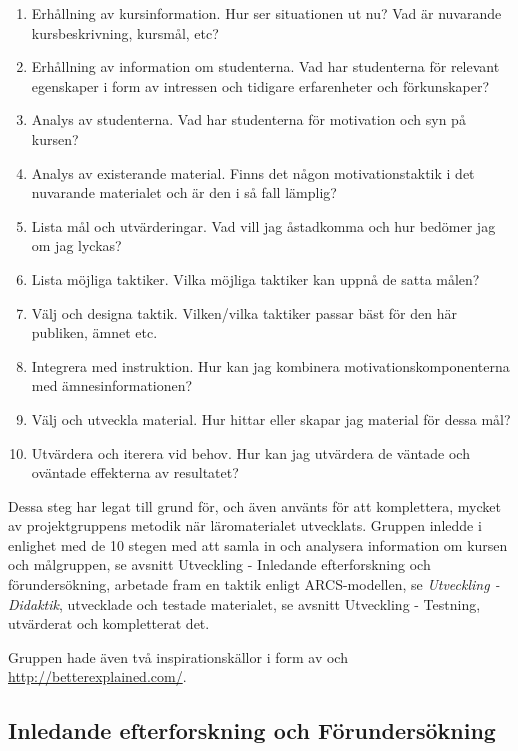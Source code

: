 \documentclass[]{article}
\begin{document}
\begin{enumerate}
  \item Erhållning av kursinformation. Hur ser situationen ut nu? Vad är nuvarande kursbeskrivning, kursmål, etc?
  \item Erhållning av information om studenterna. Vad har studenterna för relevant egenskaper i form av intressen och 
  tidigare erfarenheter och förkunskaper?
  \item Analys av studenterna. Vad har studenterna för motivation och syn på kursen?
  \item Analys av existerande material. Finns det någon motivationstaktik i det nuvarande materialet och är den i så 
  fall lämplig?
  \item Lista mål och utvärderingar. Vad vill jag åstadkomma och hur bedömer jag om jag lyckas?
  \item Lista möjliga taktiker. Vilka möjliga taktiker kan uppnå de satta målen?
  \item Välj och designa taktik. Vilken/vilka taktiker passar bäst för den här publiken, ämnet etc.
  \item Integrera med instruktion. Hur kan jag kombinera motivationskomponenterna med ämnesinformationen?
  \item Välj och utveckla material. Hur hittar eller skapar jag material för dessa mål?
  \item Utvärdera och iterera vid behov. Hur kan jag utvärdera de väntade och oväntade effekterna av resultatet?
\end{enumerate}


Dessa steg har legat till grund för, och även använts för att komplettera, mycket av projektgruppens metodik när 
läromaterialet utvecklats. Gruppen inledde i enlighet med de 10 stegen med att samla in och analysera information om 
kursen och målgruppen, se avsnitt Utveckling - Inledande efterforskning och förundersökning, arbetade fram en taktik 
enligt ARCS-modellen, se \textit{Utveckling - Didaktik}, utvecklade och testade materialet, se avsnitt 
{Utveckling - Testning}, utvärderat och kompletterat det.

Gruppen hade även två inspirationskällor i form av \cite{learnyouahaskell} och \url{http://betterexplained.com/}. 


\subsection{Inledande efterforskning och Förundersökning}
\end{document}
